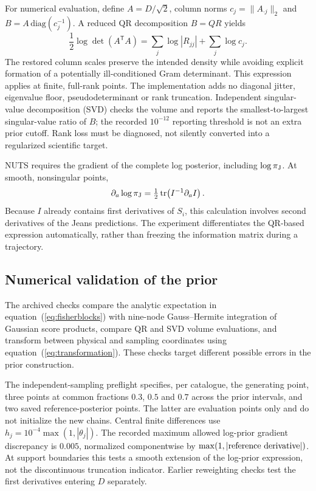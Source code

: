 For numerical evaluation, define $A=D/\sqrt{2}$, column norms $c_j=\|A_{\cdot j}\|_2$ and $B=A\,\mathrm{diag}(c_j^{-1})$. A reduced QR decomposition $B=QR$ yields
\begin{equation}
 \frac{1}{2}\log\det(A^{\mathsf T}A)
    =\sum_j\log|R_{jj}|+\sum_j\log c_j .
 \label{eq:qr}
\end{equation}
The restored column scales preserve the intended density while avoiding explicit formation of a potentially ill-conditioned Gram determinant. This expression applies at finite, full-rank points. The implementation adds no diagonal jitter, eigenvalue floor, pseudodeterminant or rank truncation. Independent singular-value decomposition (SVD) checks the volume and reports the smallest-to-largest singular-value ratio of $B$; the recorded $10^{-12}$ reporting threshold is not an extra prior cutoff. Rank loss must be diagnosed, not silently converted into a regularized scientific target.

NUTS requires the gradient of the complete log posterior, including $\log\pi_{\rm J}$. At smooth, nonsingular points,
\begin{equation}
 \partial_a\log\pi_{\rm J}
   =\tfrac12\,\mathrm{tr}\!\left(I^{-1}\partial_a I\right).
\end{equation}
Because $I$ already contains first derivatives of $S_i$, this calculation involves second derivatives of the Jeans predictions. The experiment differentiates the QR-based expression automatically, rather than freezing the information matrix during a trajectory.

\subsection{Numerical validation of the prior}
\label{sec:numerics}
The archived checks compare the analytic expectation in equation~(\ref{eq:fisherblocks}) with nine-node Gauss--Hermite integration of Gaussian score products, compare QR and SVD volume evaluations, and transform between physical and sampling coordinates using equation~(\ref{eq:transformation}). These checks target different possible errors in the prior construction.

The independent-sampling preflight specifies, per catalogue, the generating point, three points at common fractions $0.3$, $0.5$ and $0.7$ across the prior intervals, and two saved reference-posterior points. The latter are evaluation points only and do not initialize the new chains. Central finite differences use $h_j=10^{-4}\max(1,|\theta_j|)$. The recorded maximum allowed log-prior gradient discrepancy is $0.005$, normalized componentwise by $\max(1,|\hbox{reference derivative}|)$. At support boundaries this tests a smooth extension of the log-prior expression, not the discontinuous truncation indicator. Earlier reweighting checks test the first derivatives entering $D$ separately.

